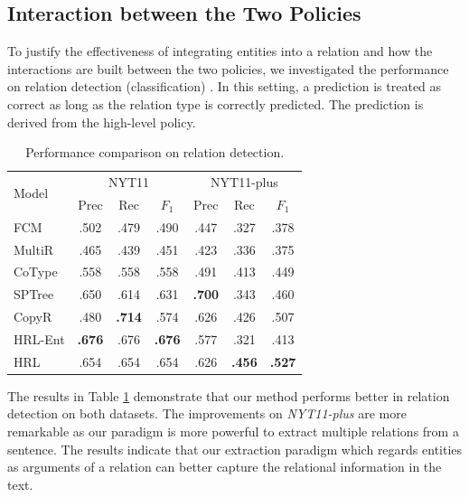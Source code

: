 \documentclass[letterpaper]{article} %
\theoremstyle{definition}
\begin{document}
\subsection{Interaction between the Two Policies}

To justify the effectiveness of integrating entities into a relation and how the interactions are built between the two policies, we investigated the performance on relation detection (classification)%
. In this setting, a prediction is treated as correct as long as the relation type is correctly predicted. The prediction is derived from the high-level policy. 

\begin{table}[!htb]
    \centering
    \begin{tabular}{lcccccc}
    \toprule
        \multirow{2}{*}{Model} & \multicolumn{3}{c}{NYT11} & \multicolumn{3}{c}{NYT11-plus}\\
         & Prec & Rec & $F_1$ & Prec & Rec & $F_1$ \\
    \midrule
        FCM    & .502 & .479 & .490 & .447 & .327 & .378 \\
        MultiR & .465 & .439 & .451 & .423 & .336 & .375 \\
        CoType & .558 & .558 & .558 & .491 & .413 & .449 \\
        SPTree & .650 & .614 & .631 & \textbf{.700} & .343 & .460 \\
        CopyR & .480 & \textbf{.714} & .574 & .626 & .426 & .507\\
    \midrule
        HRL-Ent  & \textbf{.676} & .676 & \textbf{.676} & .577 & .321 & .413 \\
        HRL    & .654 & .654 & .654 & .626 & \textbf{.456} & \textbf{.527} \\
    \bottomrule
    \end{tabular}
    \caption{Performance comparison on relation detection.} %
    \label{relation}
\end{table} 

The results in Table \ref{relation} demonstrate that our method performs better in relation detection on both datasets. The improvements on {\it NYT11-plus} are more remarkable as our paradigm is more powerful to extract multiple relations from a sentence. 
The results indicate that our extraction paradigm which regards entities as arguments of a relation can better capture the relational information in the text.
\end{document}
